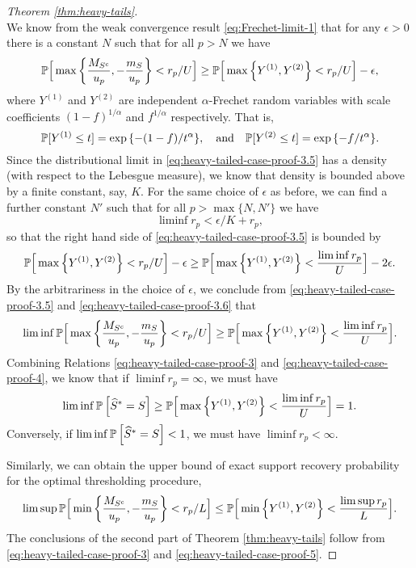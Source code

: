 \begin{proof}[Theorem \ref{thm:heavy-tails}]
\begin{equation}
\end{equation}
We know from the weak convergence result \eqref{eq:Frechet-limit-1} that for any $\epsilon>0$ there is a constant $N$ such that for all $p>N$ we have 
\begin{equation} \label{eq:heavy-tailed-case-proof-3.5}
    \P\Big[\max\left\{\frac{M_{S^c}}{u_p}, -\frac{m_S}{u_p}\right\} < r_p/U\Big]
    \ge \P\Big[\max\left\{Y^{(1)}, Y^{(2)}\right\} < {r_p}/{U}\Big] - \epsilon,
\end{equation}
where $Y^{(1)}$ and $Y^{(2)}$ are independent $\alpha$-Frechet random variables with scale coefficients $(1-f)^{1/\alpha}$ and $f^{1/\alpha}$ respectively.
That is,
\begin{equation*}
    \P[Y^{(1)}\le t] = \exp{\{-(1-f)/t^\alpha\}}, 
    \quad \text{and} \quad
    \P[Y^{(2)}\le t] = \exp{\{-f/t^\alpha\}}.
\end{equation*}
Since the distributional limit in \eqref{eq:heavy-tailed-case-proof-3.5} has a density (with respect to the Lebesgue measure), we know that density is bounded above by a finite constant, say, $K$.
For the same choice of $\epsilon$ as before, we can find a further constant $N'$ such that for all $p>\max\{N, N'\}$ we have 
$$
    \liminf r_p < \epsilon/K + r_p,
$$
so that the right hand side of \eqref{eq:heavy-tailed-case-proof-3.5} is bounded by
\begin{equation} \label{eq:heavy-tailed-case-proof-3.6}
    \P\Big[\max\left\{Y^{(1)}, Y^{(2)}\right\} < {r_p}/{U}\Big] - \epsilon
    \ge \P\Big[\max\left\{Y^{(1)}, Y^{(2)}\right\} < \frac{\liminf r_p}{U}\Big] - 2\epsilon.
\end{equation}
By the arbitrariness in the choice of $\epsilon$, we conclude from \eqref{eq:heavy-tailed-case-proof-3.5} and \eqref{eq:heavy-tailed-case-proof-3.6} that
\begin{equation} \label{eq:heavy-tailed-case-proof-4}
    \liminf \P\Big[\max\left\{\frac{M_{S^c}}{u_p}, -\frac{m_S}{u_p}\right\} < r_p/U\Big]
    \ge \P\Big[\max\left\{Y^{(1)}, Y^{(2)}\right\} < \frac{\liminf r_p}{U}\Big].
\end{equation}
Combining Relations \eqref{eq:heavy-tailed-case-proof-3} and \eqref{eq:heavy-tailed-case-proof-4}, we know that if $\liminf r_p = \infty$, we must have 
$$
    \liminf\P\left[\widehat{S}^*=S\right]
    \ge \P\Big[\max\left\{Y^{(1)}, Y^{(2)}\right\} < \frac{\liminf r_p}{U}\Big] = 1.
$$
Conversely, if $\liminf\P\left[\widehat{S}^*=S\right]<1$, we must have $\liminf r_p < \infty$.

Similarly, we can obtain the upper bound of exact support recovery probability for the optimal thresholding procedure,
\begin{equation} \label{eq:heavy-tailed-case-proof-5}
    \limsup \P\Big[\min\left\{\frac{M_{S^c}}{u_p}, -\frac{m_S}{u_p}\right\} < r_p/L\Big]
    \le \P\Big[\min\left\{Y^{(1)}, Y^{(2)}\right\} < \frac{\limsup r_p}{L}\Big].
\end{equation}
The conclusions of the second part of Theorem \ref{thm:heavy-tails} follow from \eqref{eq:heavy-tailed-case-proof-3} and \eqref{eq:heavy-tailed-case-proof-5}.
\end{proof}

